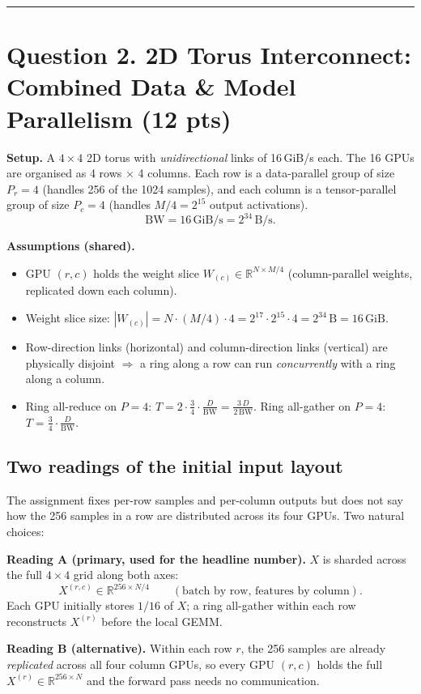 \documentclass[11pt]{article}
\newcommand{\step}[1]{\noindent\textbf{#1}\quad}
\begin{document}
\vspace{4pt}\rule{\textwidth}{0.4pt}

\section*{Question 2. 2D Torus Interconnect: Combined Data \& Model Parallelism (12 pts)}

\textbf{Setup.} A $4\times 4$ 2D torus with \emph{unidirectional} links
of 16\,GiB/s each. The 16 GPUs are organised as 4 rows
$\times$ 4 columns. Each row is a data-parallel group of size $P_r = 4$
(handles 256 of the 1024 samples), and each column is a tensor-parallel
group of size $P_c = 4$ (handles $M/4 = 2^{15}$ output activations).
\[
    \mathrm{BW} = 16\,\text{GiB/s} = 2^{34}\,\text{B/s}.
\]

\begin{stepbox}
\step{Assumptions (shared).}
\begin{itemize}[leftmargin=*, itemsep=1pt]
    \item GPU $(r,c)$ holds the weight slice
        $W_{(c)} \in \mathbb{R}^{N\times M/4}$ (column-parallel weights,
        replicated down each column).
    \item Weight slice size: $|W_{(c)}| = N\!\cdot\!(M/4)\!\cdot\! 4
        = 2^{17}\!\cdot\! 2^{15}\!\cdot\! 4 = 2^{34}\,\text{B} = 16\,\text{GiB}$.
    \item Row-direction links (horizontal) and column-direction links
        (vertical) are physically disjoint $\Rightarrow$ a ring along a row
        can run \emph{concurrently} with a ring along a column.
    \item Ring all-reduce on $P=4$:
        $T = 2\cdot\tfrac{3}{4}\cdot \tfrac{D}{\mathrm{BW}} = \tfrac{3\,D}{2\,\mathrm{BW}}$.
        Ring all-gather on $P=4$:
        $T = \tfrac{3}{4}\cdot\tfrac{D}{\mathrm{BW}}$.
\end{itemize}
\end{stepbox}

\subsection*{Two readings of the initial input layout}

The assignment fixes per-row samples and per-column outputs but does not say
how the 256 samples in a row are distributed across its four GPUs.
Two natural choices:

\begin{stepbox}
\step{Reading A (primary, used for the headline number).}
$X$ is sharded across the full $4\times 4$ grid along both axes:
\[
    X^{(r,c)} \in \mathbb{R}^{256 \times N/4}
    \qquad(\text{batch by row, features by column}).
\]
Each GPU initially stores $1/16$ of $X$; a ring all-gather within each row
reconstructs $X^{(r)}$ before the local GEMM.

\medskip
\step{Reading B (alternative).}
Within each row $r$, the 256 samples are already \emph{replicated} across
all four column GPUs, so every GPU $(r,c)$ holds the full
$X^{(r)} \in \mathbb{R}^{256\times N}$ and the forward pass needs no communication.
\end{stepbox}
\end{document}
